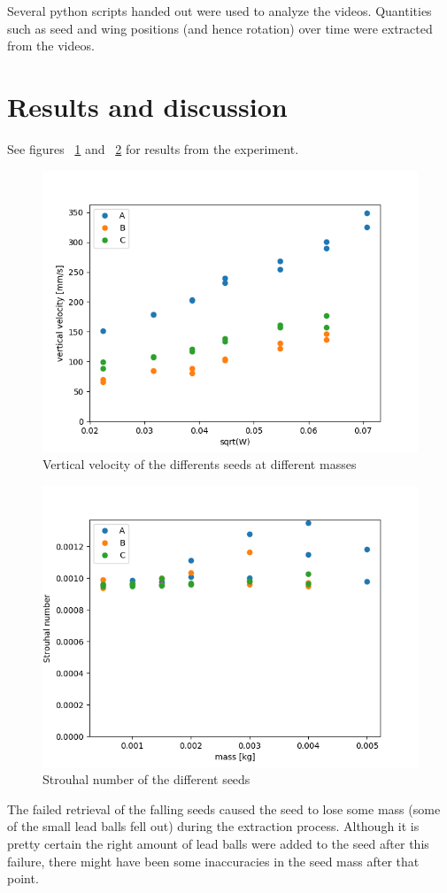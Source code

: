\documentclass[aps,reprint]{revtex4-1}
\newcommand\blankpage{%
  \null
  \thispagestyle{empty}%
  \addtocounter{page}{-1}%
  \newpage}
\begin{document}
Several python scripts handed out were used to analyze the videos. Quantities
such as seed and wing positions (and hence rotation) over time were extracted
from the videos.
\label{sec:method}
\section{Results and discussion}
See figures ~\ref{fig:oppg1} and ~\ref{fig:oppg2} for results from the
experiment.
\begin{figure}
  \includegraphics[width=0.8\linewidth]{oppg1.png}
  \caption{
    \label{fig:oppg1}
    Vertical velocity of the differents seeds at different masses
  }
\end{figure}
\begin{figure}
  \includegraphics[width=0.8\linewidth]{oppg2.png}
  \caption{
    \label{fig:oppg2}
    Strouhal number of the different seeds
  }
\end{figure}
The failed retrieval of the falling seeds caused the seed to lose some mass
(some of the small lead balls fell out) during the extraction process. Although
it is pretty certain the right amount of lead balls were added to the seed after
this failure, there might have been some inaccuracies in the seed mass after that
point. 
\label{sec:results}


\blankpage
\end{document}
